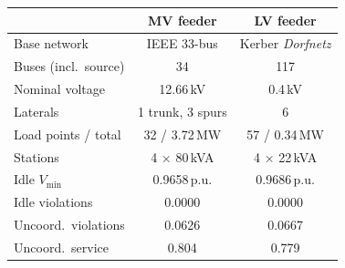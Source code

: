 \begin{tabular}{lcc}
\toprule
 & \textbf{MV feeder} & \textbf{LV feeder} \\
\midrule
Base network & IEEE 33-bus & Kerber \emph{Dorfnetz} \\
Buses (incl.\ source) & 34 & 117 \\
Nominal voltage & 12.66\,kV & 0.4\,kV \\
Laterals & 1 trunk, 3 spurs & 6 \\
Load points / total & 32 / 3.72\,MW & 57 / 0.34\,MW \\
Stations & 4 $\times$ 80\,kVA & 4 $\times$ 22\,kVA \\
Idle $V_{\min}$ & 0.9658\,p.u. & 0.9686\,p.u. \\
Idle violations & 0.0000 & 0.0000 \\
Uncoord.\ violations & 0.0626 & 0.0667 \\
Uncoord.\ service & 0.804 & 0.779 \\
\bottomrule
\end{tabular}
